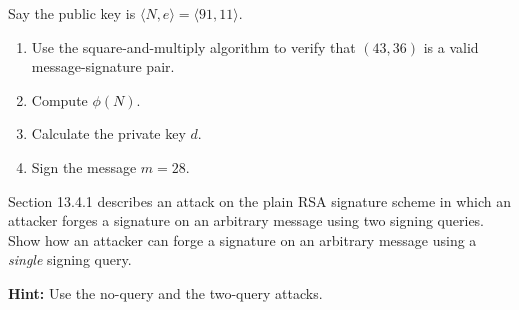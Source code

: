 \documentclass[a4paper,10pt,landscape,twocolumn]{scrartcl}
\begin{document}
\begin{exercise}
\begin{subex}
Say the public key is $\langle N,e \rangle=\langle 91,11\rangle$.
\begin{enumerate}
\item Use the square-and-multiply algorithm to verify that $(43,36)$ is a valid message-signature pair.
\item Compute $\phi(N)$.
\item Calculate the private key $d$.
\item Sign the message $m=28$.
\end{enumerate}
\end{subex}

\begin{subex}

Section 13.4.1 describes an attack on the
plain RSA signature scheme in which an attacker forges a signature
on an arbitrary message using two signing queries. Show how an
attacker can forge a signature on an arbitrary message using a
\emph{single} signing query.

\textbf{Hint:} Use the no-query and the two-query attacks. 
\end{subex}

\end{exercise}
\end{document}
